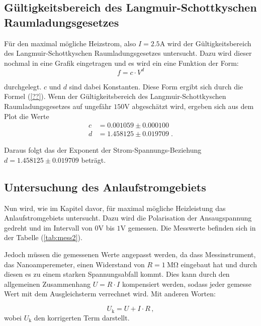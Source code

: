 \subsection{Gültigkeitsbereich des Langmuir-Schottkyschen Raumladungsgesetzes}

Für den maximal mögliche Heizstrom, also $I = 2.5 \si{\ampere}$ wird der Gültigkeitsbereich des Langmuir-Schottkyschen Raumladungsgesetzes untersucht. Dazu wird dieser nochmal in eine 
Grafik eingetragen und es wird ein eine Funktion der Form:
\begin{equation*}
    f = c \cdot V^d    
\end{equation*}

durchgelegt. $c$ und $d$ sind dabei Konstanten. Diese Form ergibt sich durch die Formel (\ref{??}). Wenn der Gültigkeitsbereich des Langmuir-Schottkyschen Raumladungsgesetzes
auf ungefähr $150 \si{\volt} $ abgeschätzt wird, ergeben sich aus dem Plot die Werte
\begin{align*}
    c &= 0.001059 \pm 0.000100 \\
    d &= 1.458125 \pm 0.019709 \; .
\end{align*}

Daraus folgt das der Exponent der Strom-Spannungs-Beziehung $d = 1.458125 \pm 0.019709$ beträgt.

\subsection{Untersuchung des Anlaufstromgebiets}
Nun wird, wie im Kapitel davor, für maximal mögliche Heizleistung das Anlaufstromgebiets untersucht. Dazu wird die Polarisation der Ansaugspannung gedreht und im Intervall von
$0 \si{\volt} $ bis $1 \si{\volt} $ gemessen. Die Messwerte befinden sich in der Tabelle (\ref{tab:mess2}).

Jedoch müssen die gemessenen Werte angepasst werden, da dass Messinstrument, das Nanoamperemeter, einen Widerstand von $R = \SI{1}{\mega\ohm}$
eingebaut hat und durch diesen es zu einem starken Spannungsabfall kommt. Dies kann durch den allgemeinen Zusammenhang $ U = R \cdot I$ kompensiert werden, sodass jeder gemesse Wert 
mit dem Ausgleichsterm verrechnet wird. Mit anderen Worten:

\begin{equation*}
    U_\text{k} = U + I \cdot R \, ,  
\end{equation*}
wobei $U_\text{k}$ den korrigerten Term darstellt. 

